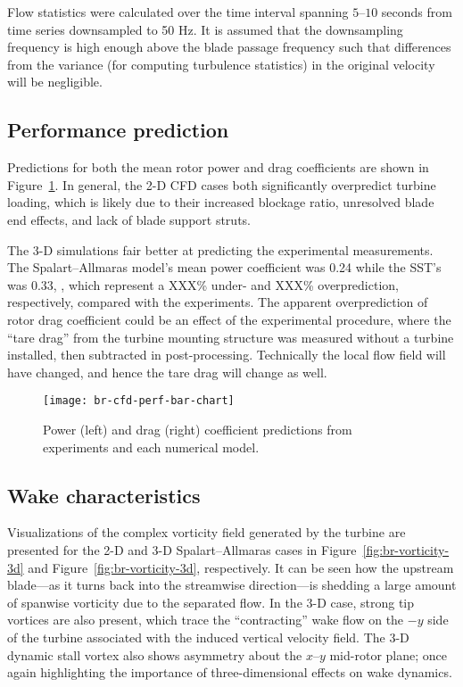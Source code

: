Flow statistics were calculated over the time interval spanning $5$--$10$
seconds from time series downsampled to 50 Hz. It is assumed that the
downsampling frequency is high enough above the blade passage frequency such
that differences from the variance (for computing turbulence statistics) in the
original velocity will be negligible.


\subsection{Performance prediction}

Predictions for both the mean rotor power and drag coefficients are shown in
Figure~\ref{fig:br-cfd-perf-bar-chart}. In general, the 2-D CFD cases both
significantly overpredict turbine loading, which is likely due to their
increased blockage ratio, unresolved blade end effects, and lack of blade
support struts.

The 3-D simulations fair better at predicting the experimental measurements. The
Spalart--Allmaras model's mean power coefficient was 0.24 while the SST's was
0.33, , which represent
a XXX\% under- and XXX\% overprediction, respectively, compared with the
experiments. The apparent overprediction of rotor drag coefficient could be an
effect of the experimental procedure, where the ``tare drag'' from the turbine
mounting structure was measured without a turbine installed, then subtracted in
post-processing. Technically the local flow field will have changed, and hence
the tare drag will change as well.

\begin{figure}
    \centering

    \texttt{[image: br-cfd-perf-bar-chart]}

    \caption{Power (left) and drag (right) coefficient predictions from
        experiments and each numerical model.}

    \label{fig:br-cfd-perf-bar-chart}
\end{figure}


\subsection{Wake characteristics}

Visualizations of the complex vorticity field generated by the turbine are
presented for the 2-D and 3-D Spalart--Allmaras cases in
Figure~\ref{fig:br-vorticity-3d} and Figure~\ref{fig:br-vorticity-3d},
respectively. It can be seen how the upstream blade---as it turns back into the
streamwise direction---is shedding a large amount of spanwise vorticity due to
the separated flow. In the 3-D case, strong tip vortices are also present, which
trace the ``contracting'' wake flow on the $-y$ side of the turbine associated
with the induced vertical velocity field. The 3-D dynamic stall vortex also
shows asymmetry about the $x$--$y$ mid-rotor plane; once again highlighting the
importance of three-dimensional effects on wake dynamics.

